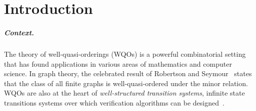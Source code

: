 \section{Introduction}
\label{sec:introduction}

% 
%
%
%
%
%
%

\subparagraph{Context.} The theory of well-quasi-orderings (WQOs) is a powerful
combinatorial setting that has found applications in various areas of
mathematics and computer science. In graph theory, the celebrated result of
Robertson and Seymour~\cite{ROBSEY04} states that the class of all finite
graphs is well-quasi-ordered under the minor relation. WQOs are also at the
heart of \emph{well-structured transition systems}, infinite state transitions
systems over which verification algorithms can be
designed~\cite{ABDU96,ABDU98}.

